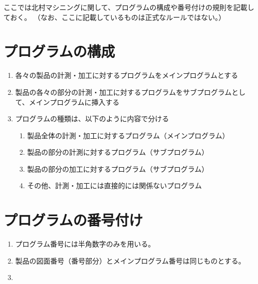 
ここでは北村マシニングに関して、プログラムの構成や番号付けの規則を記載しておく。
（なお、ここに記載しているものは正式なルールではない。）


\section{プログラムの構成}
\begin{enumerate}
\item 各々の製品の計測・加工に対するプログラムをメインプログラムとする
\item 製品の各々の部分の計測・加工に対するプログラムをサブプログラムとして、メインプログラムに挿入する
\item プログラムの種類は、以下のように内容で分ける
  \begin{enumerate}
  \item 製品全体の計測・加工に対するプログラム（メインプログラム）
  \item 製品の部分の計測に対するプログラム（サブプログラム）
  \item 製品の部分の加工に対するプログラム（サブプログラム）
  \item その他、計測・加工には直接的には関係ないプログラム
  \end{enumerate}
\end{enumerate}



\section{プログラムの番号付け}
\begin{enumerate}
\item プログラム番号には半角数字のみを用いる。
\item 製品の図面番号（番号部分）とメインプログラム番号は同じものとする。
\item
\end{enumerate}

